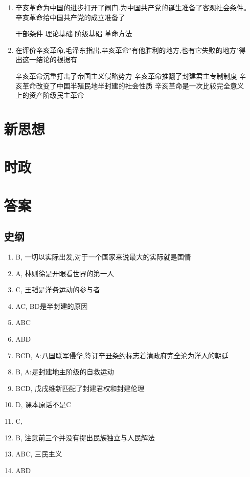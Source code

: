 \documentclass[12pt, a4paper, oneside, UTF8]{ctexbook}
\begin{document}
\begin{enumerate}
    \item \bl 辛亥革命为中国的进步打开了闸门.为中国共产党的诞生准备了客观社会条件。辛亥革命给中国共产党的成立准备了
    \begin{choices}[2]
    \task 干部条件
    \task 理论基础
    \task 阶级基础
    \task 革命方法
    \end{choices}
    
    \item \bl 在评价辛亥革命,毛泽东指出,辛亥革命"有他胜利的地方,也有它失败的地方"得出这一结论的根据有
    \begin{choices}[1]
    \task 辛亥革命沉重打击了帝国主义侵略势力
    \task 辛亥革命推翻了封建君主专制制度
    \task 辛亥革命改变了中国半殖民地半封建的社会性质
    \task 辛亥革命是一次比较完全意义上的资产阶级民主革命
    \end{choices}
    
\end{enumerate}
\section{新思想}

\section{时政}


\section{答案}

\subsection{史纲}
\begin{enumerate}
    \item B, 一切以实际出发,对于一个国家来说最大的实际就是国情
    \item A, 林则徐是开眼看世界的第一人
    \item C, 王韬是洋务运动的参与者
    \item AC, BD是半封建的原因
    \item ABC
    \item ABD
    \item BCD, A:八国联军侵华,签订辛丑条约标志着清政府完全沦为洋人的朝廷
    \item B, A:是封建地主阶级的自救运动
    \item BCD, 戊戌维新匹配了封建君权和封建伦理
    \item D, 课本原话不是C
    \item C,
    \item B, 注意前三个并没有提出民族独立与人民解法
    \item ABC, 三民主义
    \item ABD
\end{enumerate}
\ifx\allfiles\undefined
\end{document}
